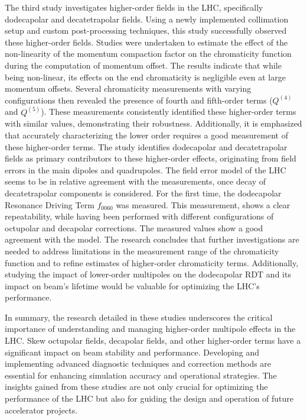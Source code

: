 {%
The third study investigates higher-order fields in the LHC, specifically dodecapolar and
decatetrapolar fields. Using a newly implemented collimation setup and custom post-processing
techniques, this study successfully observed these higher-order fields. Studies were 
undertaken to estimate the effect of the non-linearity of the momentum compaction factor on the 
chromaticity function during the computation of momentum offset. The 
results indicate that while being non-linear, its effects on the end chromaticity is negligible even 
at large momentum offsets.
Several chromaticity measurements with varying configurations then revealed the presence of fourth
and fifth-order terms ($Q^{(4)}$ and $Q^{(5)}$). These measurements consistently identified these
higher-order terms with similar values, demonstrating their robustness. Additionally, it is 
emphasized that accurately characterizing the lower order requires a good measurement of these 
higher-order terms. The study identifies dodecapolar and decatetrapolar fields as primary
contributors to these higher-order effects, originating from field errors in the main dipoles and
quadrupoles. The field error model of the LHC seems to be in relative agreement with the
measurements, once decay of decatetrapolar components is considered.
For the first time, the dodecapolar Resonance Driving Term $f_{0060}$ was measured. This measurement,
shows a clear repeatability, while having been performed with different configurations of octupolar
and decapolar corrections. The measured values show a good agreement with the model. 
The research concludes that further investigations are needed to address limitations in the
measurement range of the chromaticity function and to refine estimates of higher-order chromaticity
terms. Additionally, studying the impact of lower-order multipoles on the dodecapolar RDT and its
impact on beam's lifetime would be valuable for optimizing the LHC's performance.


In summary, the research detailed in these studies underscores the critical importance of
understanding and managing higher-order multipole effects in the LHC. Skew octupolar fields,
decapolar fields, and other higher-order terms have a significant impact on beam stability and
performance. Developing and implementing advanced diagnostic techniques and correction methods are
essential for enhancing simulation accuracy and operational strategies. The insights gained from
these studies are not only crucial for optimizing the performance of the LHC but also for guiding
the design and operation of future accelerator projects.

}
